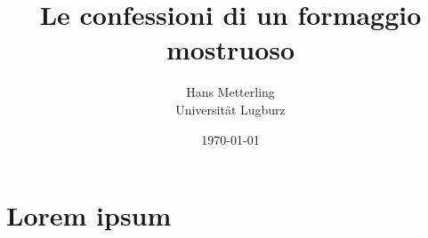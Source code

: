 \documentclass[a4paper,12pt]{report}
\title{Le confessioni di un formaggio mostruoso}
\author{Hans Metterling\\ Universit\"at Lugburz}
\date{\today}
\begin{document}
\maketitle



\section{Lorem ipsum}
\lipsum[1-3]


\end{document}
